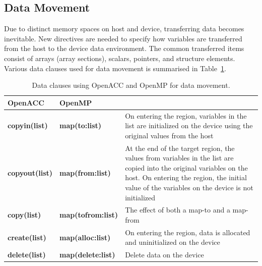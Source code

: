 







\subsection{Data Movement}

\par
Due to distinct memory spaces on host and device, transferring data becomes inevitable.
New directives are needed to specify how variables are transferred from the host to the device data environment.
The common transferred items consist of arrays (array sections), scalars, pointers, and structure elements.
Various data clauses used for data movement is summarised in Table~\ref{tbl:data_clauses_openacc_openmp}.

\begin{table}[!h]
\centering\caption{Data clauses using OpenACC and OpenMP for data movement.}\label{tbl:data_clauses_openacc_openmp}
\begin{tabular}{ | p{} | p{} | p{} | } 
\hline
\textbf{OpenACC} & \textbf{OpenMP} & \\
\hline
\textbf{copyin(list)} & \textbf{map(to:list)} & On entering the region, variables in the list are initialized on the device using the original values from the host\\
\textbf{copyout(list)} & \textbf{map(from:list)} & At the end of the target region, the values from variables in the list are copied into the original variables on the host. On entering the region, the initial value of the variables on the device is not initialized \\
\textbf{copy(list)} & \textbf{map(tofrom:list)} & The effect of both a map-to and a map-from \\
\textbf{create(list)} & \textbf{map(alloc:list)} & On entering the region, data is allocated and uninitialized on the device \\
\textbf{delete(list)} & \textbf{map(delete:list)} & Delete data on the device \\
\hline
\end{tabular}
\end{table}


